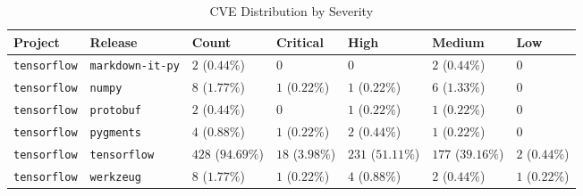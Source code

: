 \begin{table}
\caption{CVE Distribution by Severity}
\label{tab:cve-distribution}
\begin{tabular}{lllllll}
\toprule
Project & Release & Count & Critical & High & Medium & Low \\
\midrule
\texttt{tensorflow} & \texttt{markdown-it-py} & $2$ ($0.44\%$) & $0$ & $0$ & $2$ ($0.44\%$) & $0$ \\
\texttt{tensorflow} & \texttt{numpy} & $8$ ($1.77\%$) & $1$ ($0.22\%$) & $1$ ($0.22\%$) & $6$ ($1.33\%$) & $0$ \\
\texttt{tensorflow} & \texttt{protobuf} & $2$ ($0.44\%$) & $0$ & $1$ ($0.22\%$) & $1$ ($0.22\%$) & $0$ \\
\texttt{tensorflow} & \texttt{pygments} & $4$ ($0.88\%$) & $1$ ($0.22\%$) & $2$ ($0.44\%$) & $1$ ($0.22\%$) & $0$ \\
\texttt{tensorflow} & \texttt{tensorflow} & $428$ ($94.69\%$) & $18$ ($3.98\%$) & $231$ ($51.11\%$) & $177$ ($39.16\%$) & $2$ ($0.44\%$) \\
\texttt{tensorflow} & \texttt{werkzeug} & $8$ ($1.77\%$) & $1$ ($0.22\%$) & $4$ ($0.88\%$) & $2$ ($0.44\%$) & $1$ ($0.22\%$) \\
\bottomrule
\end{tabular}
\end{table}
